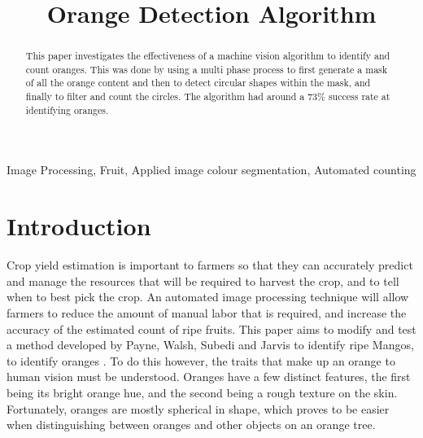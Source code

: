 \documentclass[conference]{IEEEtran}
\begin{document}
\title{Orange Detection Algorithm}

\author{
\and
{}
}

\maketitle

\begin{abstract}
This paper investigates the effectiveness of a machine vision algorithm to identify and count oranges. This was done by using a multi phase process to first generate a mask of all the orange content and then to detect circular shapes within the mask, and finally to filter and count the circles. The algorithm had around a 73\% success rate at identifying oranges.
\end{abstract}

\begin{IEEEkeywords}
Image Processing, Fruit, Applied image colour segmentation, Automated counting
\end{IEEEkeywords}

\section{Introduction}


Crop yield estimation is important to farmers so that they can accurately predict and manage the resources that will be required to harvest the crop, and to tell when to best pick the crop. An automated image processing technique will allow farmers to reduce the amount of manual labor that is required, and increase the accuracy of the estimated count of ripe fruits. This paper aims to modify and test a method developed by Payne, Walsh, Subedi and Jarvis to identify ripe Mangos, to identify oranges \cite{payne_estimation_2013}. To do this however, the traits that make up an orange to human vision must be understood. Oranges have a few distinct features, the first being its bright orange hue, and the second being a rough texture on the skin. Fortunately, oranges are mostly spherical in shape, which proves to be easier when distinguishing between oranges and other objects on an orange tree.
\end{document}
